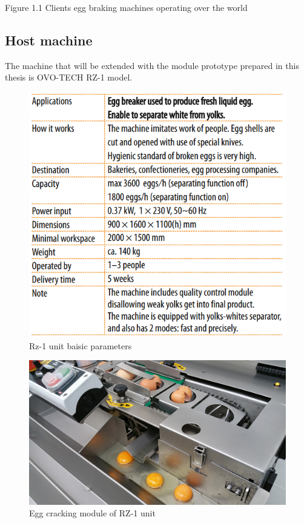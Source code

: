 \documentclass[12pt,twoside,a4paper]{article}
\begin{document}
Figure 1.1 Clients egg braking machines operating over the world


\subsection{Host machine}
The machine that will be extended with the module prototype prepared in this thesis is OVO-TECH RZ-1 model.

\begin{figure}[H]
\centering
\includegraphics[width=0.4\paperwidth]{rz1table}
\caption{Rz-1 unit baisic parameters}
\end{figure}


\begin{figure}[H]
\centering
\includegraphics[width=0.4\paperwidth]{rz1crack}
\caption{Egg cracking  module of RZ-1 unit}
\end{figure}
\end{document}
